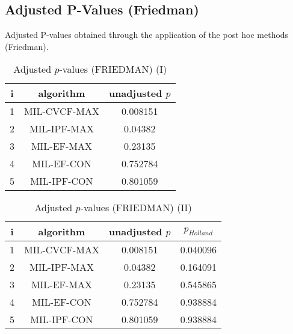 \documentclass[a4paper,10pt]{article}
\begin{document}
\begin{landscape}
\newpage

\section{Adjusted P-Values (Friedman)}


Adjusted P-values obtained through the application of the post hoc methods (Friedman).

\begin{table}[!htp]
\centering\small
\begin{tabular}{ccc}
i&algorithm&unadjusted $p$\\
\hline1&MIL-CVCF-MAX&0.008151\\2&MIL-IPF-MAX&0.04382\\3&MIL-EF-MAX&0.23135\\4&MIL-EF-CON&0.752784\\5&MIL-IPF-CON&0.801059\\\hline
\end{tabular}
\caption{Adjusted $p$-values (FRIEDMAN) (I)}
\end{table}
\begin{table}[!htp]
\centering\small
\begin{tabular}{cccc}
i&algorithm&unadjusted $p$&$p_{Holland}$\\
\hline1&MIL-CVCF-MAX&0.008151&0.040096\\2&MIL-IPF-MAX&0.04382&0.164091\\3&MIL-EF-MAX&0.23135&0.545865\\4&MIL-EF-CON&0.752784&0.938884\\5&MIL-IPF-CON&0.801059&0.938884\\\hline
\end{tabular}
\caption{Adjusted $p$-values (FRIEDMAN) (II)}
\end{table}

\newpage
\end{landscape}
\end{document}
